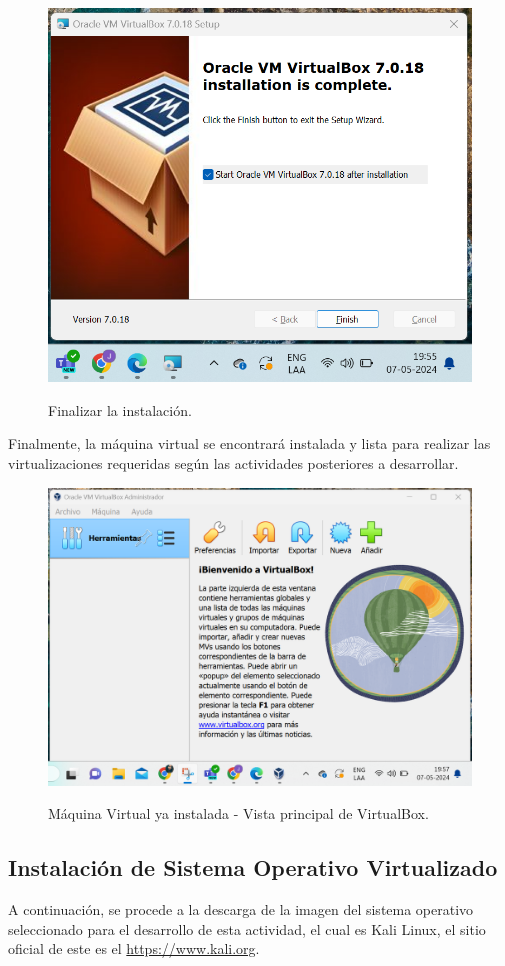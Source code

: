 \documentclass[stu, 11pt, letterpaper, donotrepeattitle, floatsintext, natbib]{apa7}
\begin{document}
\begin{figure}[H]
    \centering
    \caption{Finalizar la instalación.}
    \includegraphics[width=0.5\linewidth]{imagenCap2/8.png} %
    \label{fig:OverallEffect}
\end{figure}

Finalmente, la máquina virtual se encontrará instalada y lista para realizar las virtualizaciones requeridas según las actividades posteriores a desarrollar.
 \hfill \break
\begin{figure}[H]
    \centering
    \caption{Máquina Virtual ya instalada - Vista principal de VirtualBox.}
    \includegraphics[width=0.5\linewidth]{imagenCap2/9.png} %
    \label{fig:OverallEffect}
\end{figure}
 
\subsection{Instalación de Sistema Operativo Virtualizado}

A continuación, se procede a la descarga de la imagen del sistema operativo seleccionado para el desarrollo de esta actividad, el cual es Kali Linux, el sitio oficial de este es el \url{https://www.kali.org}.  \citep{kali}
\end{document}
